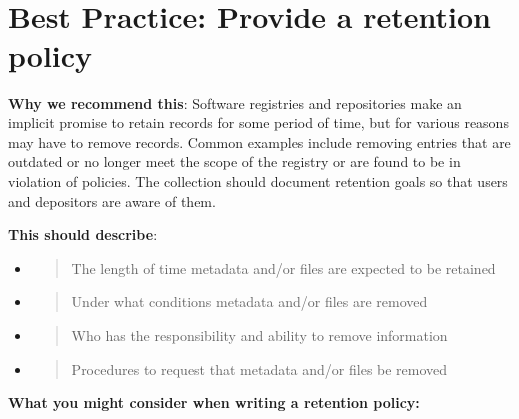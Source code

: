 \documentclass[]{article}
\begin{document}
\section{\texorpdfstring{\\
}{ }}\label{section-8}

\newpage
\section{Best Practice: Provide a retention
policy}\label{best-practice-provide-a-retention-policy}

\textbf{Why we recommend this}: Software registries and repositories
make an implicit promise to retain records for some period of time, but
for various reasons may have to remove records. Common examples include
removing entries that are outdated or no longer meet the scope of the
registry or are found to be in violation of policies. The collection
should document retention goals so that users and depositors are aware
of them.

\textbf{This should describe}:

\begin{itemize}
\item
  \begin{quote}
  The length of time metadata and/or files are expected to be retained
  \end{quote}
\item
  \begin{quote}
  Under what conditions metadata and/or files are removed
  \end{quote}
\item
  \begin{quote}
  Who has the responsibility and ability to remove information
  \end{quote}
\item
  \begin{quote}
  Procedures to request that metadata and/or files be removed
  \end{quote}
\end{itemize}

\textbf{What you might consider when writing a retention policy:}
\end{document}
